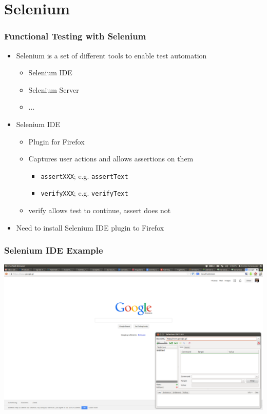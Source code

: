 \documentclass{beamer}
\begin{document}
\section{Selenium}
\begin{frame}[fragile]\frametitle{Functional Testing with Selenium} 

  \begin{itemize}
    \item Selenium is a set of different tools to enable test automation
    \begin{itemize}
      \item Selenium IDE
      \item Selenium Server
      \item ...
    \end{itemize}

    \item Selenium IDE
    \begin{itemize}
      \item Plugin for Firefox
      \item Captures user actions and allows assertions on them
      \begin{itemize}
        \item \texttt{assertXXX}; e.g. \texttt{assertText}
        \item \texttt{verifyXXX}; e.g. \texttt{verifyText}
      \end{itemize}
      \item verify allows test to continue, assert does not
    \end{itemize}
    
    \item Need to install Selenium IDE plugin to Firefox
  \end{itemize}
  
\end{frame}


\begin{frame}[fragile]\frametitle{Selenium IDE Example} 

  \includegraphics[scale=0.18]{images/starting_selenium_ide.png}
  
\end{frame}
\end{document}
